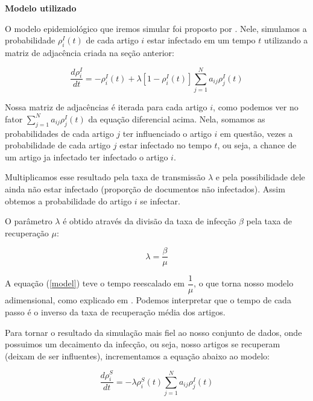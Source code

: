 \documentclass[a4paper,12pt]{article}
\begin{document}
 \begin{description}
  \item \textbf{Modelo utilizado}
      
    O modelo epidemiológico que iremos simular foi proposto por \citet[p. 940, eq. (33)]{pastor2014epidemic}. Nele,
    simulamos a probabilidade $\rho^{I}_{i}(t)$ de cada artigo $i$ estar infectado em um tempo $t$ utilizando a matriz de adjacência criada na seção anterior:

    \begin{equation}
      \dfrac{d\rho^{I}_{i}}{dt} = -\rho^{I}_{i}(t) + \lambda[1- \rho_{i}^{I}(t)] \sum_{j=1}^{N} a_{ij}\rho_{j}^{I}(t)
      \label{model}
    \end{equation}

    Nossa matriz de adjacências é iterada para cada artigo $i$, como podemos ver no fator $\sum_{j=1}^{N} a_{ij}\rho_{j}^{I}(t)$ da 
    equação diferencial acima. Nela, somamos as probabilidades de cada artigo $j$ ter influenciado o artigo $i$ em questão, vezes a probabilidade
    de cada artigo $j$ estar infectado no tempo $t$, ou seja, a chance de um artigo ja infectado ter infectado o artigo $i$.
    
    Multiplicamos esse resultado pela taxa de transmissão $\lambda$ e pela possibilidade dele ainda não estar infectado (proporção
    de documentos não infectados). Assim obtemos a probabilidade do artigo $i$ se infectar. 
    
    O parâmetro $\lambda$ é obtido através da divisão da taxa de infecção $\beta$ pela taxa de recuperação $\mu$:
    
    \begin{equation}
     \lambda = \dfrac{\beta}{\mu}
    \end{equation}
    
    A equação (\ref{model}) teve o tempo reescalado em $\dfrac{1}{\mu}$, o que torna nosso modelo adimensional,
    como explicado em \citet[p. 939]{pastor2014epidemic}. Podemos interpretar que o tempo de cada passo é o inverso da taxa de 
    recuperação  média dos artigos. 
   
    Para tornar o resultado da simulação mais fiel ao nosso conjunto de dados, onde possuimos um decaimento da infecção, ou seja,
    nosso artigos se recuperam (deixam de ser influentes), incrementamos a equação abaixo ao modelo:
    
    \begin{equation}
      \dfrac{d\rho^{S}_{i}}{dt} = - \lambda\rho_{i}^{S}(t) \sum_{j=1}^{N} a_{ij}\rho_{j}^{I}(t)
      \label{model2}
    \end{equation}
    

\end{description}
\end{document}
